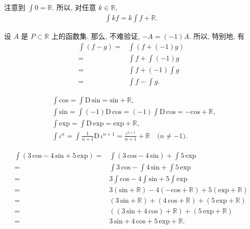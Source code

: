 \begin{remark}
    注意到 $\int {0} = \mathbb{R}$. 所以, 对任意 $k \in \mathbb{R}$,
    \begin{align*}
        \int {kf} = k\int {f} + \mathbb{R}.
    \end{align*}
\end{remark}

\begin{example}
    设 $A$ 是 $P \subset \mathbb{R}$ 上的函数集. 那么, 不难验证, $-A = (-1)A$. 所以, 特别地, 有
    \begin{align*}
        \int {(f - g)}
        = {} & \int {(f + (-1)g)}      \\
        = {} & \int {f} + \int {(-1)g} \\
        = {} & \int {f} + (-1)\int {g} \\
        = {} & \int {f} - \int {g}.
    \end{align*}
\end{example}

\begin{example}
    \begin{align*}
         & \int {\mathrm{cos}} = \int {\mathrm{D}\,\mathrm{sin}} = \mathrm{sin} + \mathbb{R},                                               \\
         & \int {\mathrm{sin}} = \int {(-1)\mathrm{D}\,\mathrm{cos}} = (-1)\int {\mathrm{D}\,\mathrm{cos}} = -\mathrm{cos} + \mathbb{R},    \\
         & \int {\mathrm{exp}} = \int {\mathrm{D}\,\mathrm{exp}} = \mathrm{exp} + \mathbb{R},                                               \\
         & \int {\iota^n} = \int {\frac{1}{n+1} \mathrm{D}\,\iota^{n+1}} = \frac{\iota^{n+1}}{n+1} + \mathbb{R} \quad \text{($n \neq -1$)}.
    \end{align*}
\end{example}

\begin{example}
    \begin{align*}
        \int {(3\,\mathrm{cos} - 4\,\mathrm{sin} + 5\,\mathrm{exp})}
        = {} & \int {(3\,\mathrm{cos} - 4\,\mathrm{sin})} + \int {5\,\mathrm{exp}}                              \\
        = {} & \int {3\,\mathrm{cos}} - \int {4\,\mathrm{sin}} + \int {5\,\mathrm{exp}}                         \\
        = {} & 3\int {\mathrm{cos}} - 4\int {\mathrm{sin}} + 5\int {\mathrm{exp}}                               \\
        = {} & 3(\mathrm{sin} + \mathbb{R}) - 4(-\mathrm{cos} + \mathbb{R}) + 5(\mathrm{exp} + \mathbb{R})      \\
        = {} & (3\,\mathrm{sin} + \mathbb{R}) + (4\,\mathrm{cos} + \mathbb{R}) + (5\,\mathrm{exp} + \mathbb{R}) \\
        = {} & ((3\,\mathrm{sin} + 4\,\mathrm{cos}) + \mathbb{R}) + (5\,\mathrm{exp} + \mathbb{R})              \\
        = {} & 3\,\mathrm{sin} + 4\,\mathrm{cos} + 5\,\mathrm{exp} + \mathbb{R}.
    \end{align*}
\end{example}

